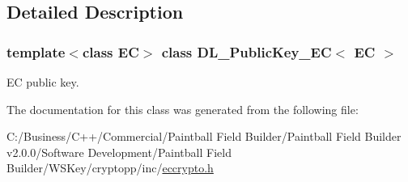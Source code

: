 \subsection{Detailed Description}
\subsubsection*{template$<$class EC$>$ class DL\_\-PublicKey\_\-EC$<$ EC $>$}

EC public key. 

The documentation for this class was generated from the following file:\begin{DoxyCompactItemize}
\item 
C:/Business/C++/Commercial/Paintball Field Builder/Paintball Field Builder v2.0.0/Software Development/Paintball Field Builder/WSKey/cryptopp/inc/\hyperlink{eccrypto_8h}{eccrypto.h}\end{DoxyCompactItemize}
